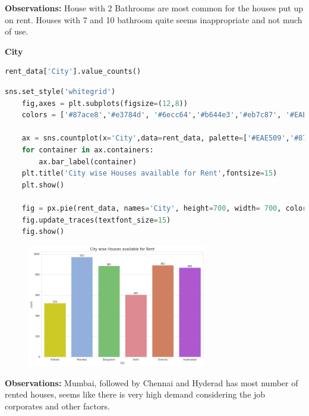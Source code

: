 \noindent\textbf{Observations:}
House with 2 Bathrooms are most common for the houses put up on rent. Houses with 7 and 10 bathroom quite seems inappropriate and not much of use.
\medskip

\noindent\textbf{City}
\begin{lstlisting}[language=python]
    rent_data['City'].value_counts()
\end{lstlisting}


\begin{lstlisting}[language=python]
    sns.set_style('whitegrid')
    fig,axes = plt.subplots(figsize=(12,8))
    colors = ['#87ace8','#e3784d', '#6ecc64','#b644e3','#eb7c87', '#EAE509']
    
    ax = sns.countplot(x='City',data=rent_data, palette=['#EAE509','#87ace8', '#6ecc64','#eb7c87','#e3784d','#b644e3'])
    for container in ax.containers:
        ax.bar_label(container)
    plt.title('City wise Houses available for Rent',fontsize=15)
    plt.show()
    
    fig = px.pie(rent_data, names='City', height=700, width= 700, color_discrete_sequence=px.colors.sequential.deep, title='Pie Chart for Houses available for Rent in different cities')
    fig.update_traces(textfont_size=15)
    fig.show()
\end{lstlisting}

\begin{figure}[h]
    \centering
    \includegraphics[width=0.7\textwidth]{Images/citygraph.png}
\end{figure}

\noindent\textbf{Observations:}
Mumbai, followed by Chennai and Hyderad has most number of rented houses, seems like there is very high demand considering the job corporates and other factors.
\medskip

